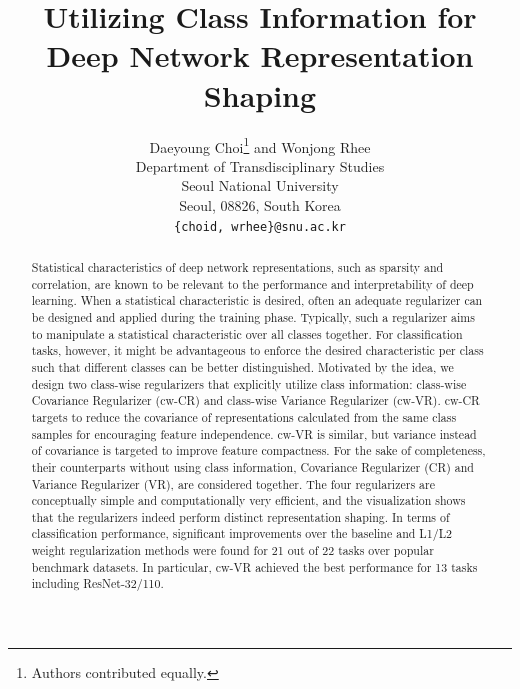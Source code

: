 \documentclass[letterpaper]{article} %
\begin{document}
%
\title{Utilizing Class Information for Deep Network Representation Shaping}

\author{Daeyoung Choi\thanks{Authors contributed equally.} and Wonjong Rhee\footnotemark[1] \\
Department of Transdisciplinary Studies\\
Seoul National University\\
Seoul, 08826, South Korea \\
\texttt{\{choid, wrhee\}@snu.ac.kr} 
}
\maketitle
\begin{abstract}
Statistical characteristics of deep network representations, such as sparsity and correlation, are known to be relevant to the performance and interpretability of deep learning. When a statistical characteristic is desired, often an adequate regularizer can be designed and applied during the training phase. Typically, such a regularizer aims to manipulate a statistical characteristic over all classes together. For classification tasks, however, it might be advantageous to enforce the desired characteristic per class such that different classes can be better distinguished. Motivated by the idea, we design two class-wise regularizers that explicitly utilize class information: class-wise Covariance Regularizer (cw-CR) and class-wise Variance Regularizer (cw-VR). cw-CR targets to reduce the covariance of representations calculated from the same class samples for encouraging feature independence. cw-VR is similar, but variance instead of covariance is targeted to improve feature compactness. For the sake of completeness, their counterparts without using class information, Covariance Regularizer (CR) and Variance Regularizer (VR), are considered together. The four regularizers are conceptually simple and computationally very efficient, and the visualization shows that the regularizers indeed perform distinct representation shaping. In terms of classification performance, significant improvements over the baseline and L1/L2 weight regularization methods were found for 21 out of 22 tasks over popular benchmark datasets. In particular, cw-VR achieved the best performance for 13 tasks including ResNet-32/110. 
\end{abstract}


\end{document}
